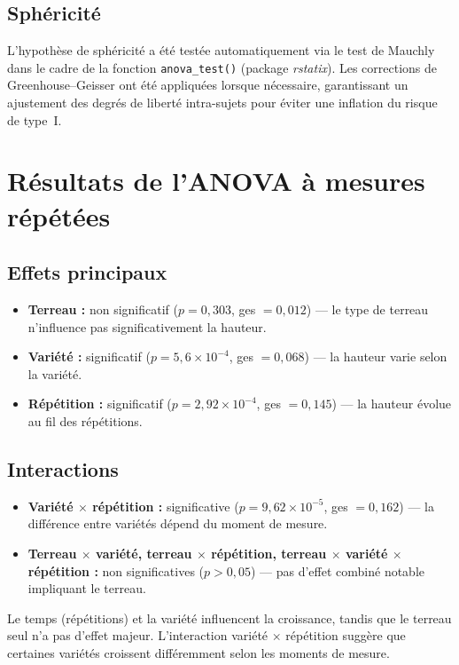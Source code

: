 \documentclass[12pt, a4paper]{report}
\begin{document}
\subsection*{Sphéricité}
L'hypothèse de sphéricité a été testée automatiquement via le test de Mauchly dans le cadre
de la fonction \texttt{anova\_test()} (package \textit{rstatix}). Les corrections de
Greenhouse–Geisser ont été appliquées lorsque nécessaire, garantissant un ajustement des
degrés de liberté intra-sujets pour éviter une inflation du risque de type~I.

\section{Résultats de l'ANOVA à mesures répétées}

\subsection*{Effets principaux}
\begin{itemize}[leftmargin=*, label=\textbullet]
  \item \textbf{Terreau :} non significatif ($p = 0{,}303$, ges $= 0{,}012$) — le type de
        terreau n'influence pas significativement la hauteur.
  \item \textbf{Variété :} significatif ($p = 5{,}6 \times 10^{-4}$, ges $= 0{,}068$) — la
        hauteur varie selon la variété.
  \item \textbf{Répétition :} significatif ($p = 2{,}92 \times 10^{-4}$, ges $= 0{,}145$) —
        la hauteur évolue au fil des répétitions.
\end{itemize}

\subsection*{Interactions}
\begin{itemize}[leftmargin=*, label=\textbullet]
  \item \textbf{Variété $\times$ répétition :} significative ($p = 9{,}62 \times 10^{-5}$,
        ges $= 0{,}162$) — la différence entre variétés dépend du moment de mesure.
  \item \textbf{Terreau $\times$ variété, terreau $\times$ répétition, terreau $\times$
        variété $\times$ répétition :} non significatives ($p > 0{,}05$) — pas d'effet
        combiné notable impliquant le terreau.
\end{itemize}

Le temps (répétitions) et la variété influencent la croissance, tandis que le terreau seul
n'a pas d'effet majeur. L'interaction variété $\times$ répétition suggère que certaines
variétés croissent différemment selon les moments de mesure.
\end{document}
